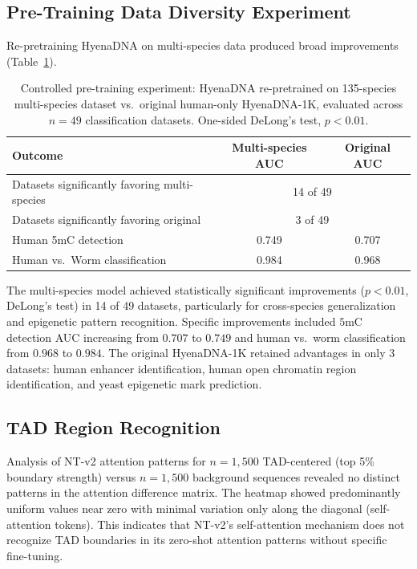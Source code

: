 \documentclass[11pt]{article}
\begin{document}
\subsection{Pre-Training Data Diversity Experiment}

Re-pretraining HyenaDNA on multi-species data produced broad improvements (Table~\ref{tab:pretraining}).

\begin{table}[htbp]
\centering
\caption{Controlled pre-training experiment: HyenaDNA re-pretrained on 135-species multi-species dataset vs.\ original human-only HyenaDNA-1K, evaluated across $n = 49$ classification datasets. One-sided DeLong's test, $p < 0.01$.}
\label{tab:pretraining}
\begin{tabular}{lcc}
\toprule
\textbf{Outcome} & \textbf{Multi-species AUC} & \textbf{Original AUC} \\
\midrule
Datasets significantly favoring multi-species & \multicolumn{2}{c}{14 of 49} \\
Datasets significantly favoring original & \multicolumn{2}{c}{3 of 49} \\
\midrule
Human 5mC detection & 0.749 & 0.707 \\
Human vs.\ Worm classification & 0.984 & 0.968 \\
\bottomrule
\end{tabular}
\end{table}

The multi-species model achieved statistically significant improvements ($p < 0.01$, DeLong's test) in 14 of 49 datasets, particularly for cross-species generalization and epigenetic pattern recognition. Specific improvements included $5$mC detection AUC increasing from $0.707$ to $0.749$ and human vs.\ worm classification from $0.968$ to $0.984$. The original HyenaDNA-1K retained advantages in only 3 datasets: human enhancer identification, human open chromatin region identification, and yeast epigenetic mark prediction.

\subsection{TAD Region Recognition}

Analysis of NT-v2 attention patterns for $n = 1{,}500$ TAD-centered (top 5\% boundary strength) versus $n = 1{,}500$ background sequences revealed no distinct patterns in the attention difference matrix. The heatmap showed predominantly uniform values near zero with minimal variation only along the diagonal (self-attention tokens). This indicates that NT-v2's self-attention mechanism does not recognize TAD boundaries in its zero-shot attention patterns without specific fine-tuning.
\end{document}
